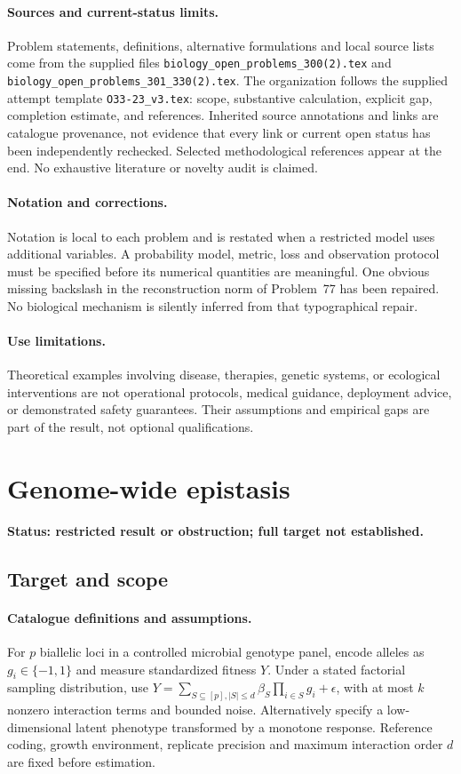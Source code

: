 \documentclass[11pt]{article}
\begin{document}
\paragraph{Sources and current-status limits.}
Problem statements, definitions, alternative formulations and local source lists
come from the supplied files
\texttt{biology\_open\_problems\_300(2).tex} and
\texttt{biology\_open\_problems\_301\_330(2).tex}.
The organization follows the supplied attempt template
\texttt{O33-23\_v3.tex}: scope, substantive calculation, explicit gap,
completion estimate, and references. Inherited source annotations and links are
catalogue provenance, not evidence that every link or current open status has
been independently rechecked. Selected methodological references appear at the
end. No exhaustive literature or novelty audit is claimed.

\paragraph{Notation and corrections.}
Notation is local to each problem and is restated when a restricted model uses
additional variables. A probability model, metric, loss and observation protocol
must be specified before its numerical quantities are meaningful. One obvious
missing backslash in the reconstruction norm of Problem~77 has been repaired.
No biological mechanism is silently inferred from that typographical repair.

\paragraph{Use limitations.}
Theoretical examples involving disease, therapies, genetic systems, or ecological
interventions are not operational protocols, medical guidance, deployment advice,
or demonstrated safety guarantees. Their assumptions and empirical gaps are part
of the result, not optional qualifications.


\section*{Genome-wide epistasis}
\label{prob:025}
\noindent\textbf{Status: restricted result or obstruction; full target not established.}
\subsection{Target and scope}
\paragraph{Catalogue definitions and assumptions.}
For $p$ biallelic loci in a controlled microbial genotype panel, encode alleles as $g_i\in\{-1,1\}$ and measure standardized fitness $Y$. Under a stated factorial sampling distribution, use $Y=\sum_{S\subseteq[p],|S|\leq d}\beta_S\prod_{i\in S}g_i+\epsilon$, with at most $k$ nonzero interaction terms and bounded noise. Alternatively specify a low-dimensional latent phenotype transformed by a monotone response. Reference coding, growth environment, replicate precision and maximum interaction order $d$ are fixed before estimation.
\end{document}

